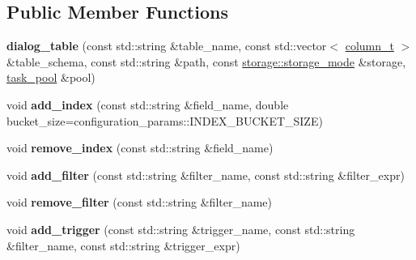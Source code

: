 \subsection*{Public Member Functions}
\begin{DoxyCompactItemize}
\item 
\mbox{\label{classdialog_1_1dialog__table_ae0a85f4bbbfa82fe99b7f7d0ba039633}} 
{\bfseries dialog\+\_\+table} (const std\+::string \&table\+\_\+name, const std\+::vector$<$ \hyperlink{classdialog_1_1column__t}{column\+\_\+t} $>$ \&table\+\_\+schema, const std\+::string \&path, const \hyperlink{structdialog_1_1storage_1_1storage__mode}{storage\+::storage\+\_\+mode} \&storage, \hyperlink{classtask__pool}{task\+\_\+pool} \&pool)
\item 
\mbox{\label{classdialog_1_1dialog__table_a30e375c7caf66c7a6b3321d1399ca310}} 
void {\bfseries add\+\_\+index} (const std\+::string \&field\+\_\+name, double bucket\+\_\+size=configuration\+\_\+params\+::\+I\+N\+D\+E\+X\+\_\+\+B\+U\+C\+K\+E\+T\+\_\+\+S\+I\+ZE)
\item 
\mbox{\label{classdialog_1_1dialog__table_a15c186e03a6002b50439897e3763fd33}} 
void {\bfseries remove\+\_\+index} (const std\+::string \&field\+\_\+name)
\item 
\mbox{\label{classdialog_1_1dialog__table_ad2d8ef16c23819cec5e3ff151b3cb311}} 
void {\bfseries add\+\_\+filter} (const std\+::string \&filter\+\_\+name, const std\+::string \&filter\+\_\+expr)
\item 
\mbox{\label{classdialog_1_1dialog__table_ace40cebd6fd29a571d1ecec5be46948c}} 
void {\bfseries remove\+\_\+filter} (const std\+::string \&filter\+\_\+name)
\item 
\mbox{\label{classdialog_1_1dialog__table_a20a1c7f7ed546dbb57030d7ec5709ad1}} 
void {\bfseries add\+\_\+trigger} (const std\+::string \&trigger\+\_\+name, const std\+::string \&filter\+\_\+name, const std\+::string \&trigger\+\_\+expr)
\item 
\mbox{\label{classdialog_1_1dialog__table_a7128fafcaf756b6f4994a7a4b71e0b32}} 

\end{DoxyCompactItemize}
